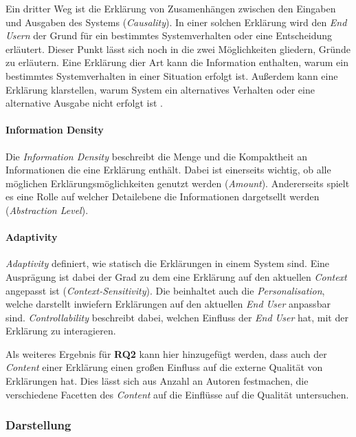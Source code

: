 Ein dritter Weg ist die Erklärung von Zusamenhängen zwischen den Eingaben und Ausgaben des Systems (\textit{Causality}). In einer solchen Erklärung wird den \textit{End Usern} der Grund für ein bestimmtes Systemverhalten oder eine Entscheidung erläutert. Dieser Punkt lässt sich noch in die zwei Möglichkeiten gliedern, Gründe zu erläutern. Eine Erklärung dier Art kann die Information enthalten, warum ein bestimmtes Systemverhalten in einer Situation erfolgt ist. Außerdem kann eine Erklärung klarstellen, warum System ein alternatives Verhalten oder eine alternative Ausgabe nicht erfolgt ist \cite{martin_evaluating_2021}.


\paragraph{Information Density} Die \textit{Information Density} beschreibt die Menge und die Kompaktheit an Informationen die eine Erklärung enthält. Dabei ist einerseits wichtig, ob alle möglichen Erklärungsmöglichkeiten genutzt werden (\textit{Amount}). Andererseits spielt es eine Rolle auf welcher Detailebene die Informationen dargetsellt werden (\textit{Abstraction Level}).

\paragraph{Adaptivity} \textit{Adaptivity} definiert, wie statisch die Erklärungen in einem System sind. Eine Ausprägung ist dabei der Grad zu dem eine Erklärung auf den aktuellen \textit{Context} angepasst ist (\textit{Context-Sensitivity}). Die beinhaltet auch die \textit{Personalisation}, welche darstellt inwiefern Erklärungen auf den aktuellen \textit{End User} anpassbar sind. \textit{Controllability} beschreibt dabei, welchen Einfluss der \textit{End User} hat, mit der Erklärung zu interagieren.

\bigskip

Als weiteres Ergebnis für \textbf{RQ2} kann hier hinzugefügt werden, dass auch der \textit{Content} einer Erklärung einen großen Einfluss auf die externe Qualität von Erklärungen hat. Dies lässt sich aus Anzahl an Autoren festmachen, die verschiedene Facetten des \textit{Content} auf die Einflüsse auf die Qualität untersuchen.

\subsubsection{Darstellung}

